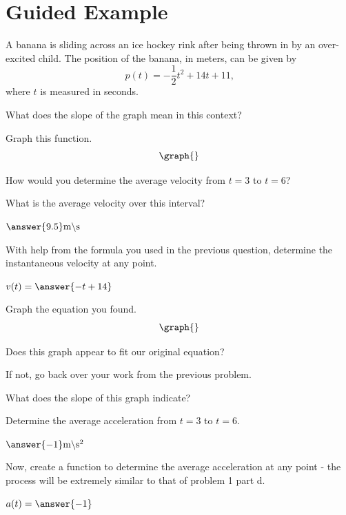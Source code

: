 \documentclass{ximera}
\begin{document}
\section{Guided Example}
\begin{question}
A banana is sliding across an ice hockey rink after being thrown in by an over-excited child. The position of the banana, in meters, can be given by $$p(t) = -\dfrac{1}{2}t^2+14t+11\text{,}$$ where $t$ is measured in seconds.

What does the slope of the graph mean in this context?
\begin{multipleChoice}
\end{multipleChoice}

Graph this function.
\[
    \graph{}
\]

How would you determine the average velocity from $t = 3$ to $t = 6$?

\begin{multipleChoice}
\end{multipleChoice}


What is the average velocity over this interval?

$\answer{9.5}\text{m} \backslash \text{s}$

With help from the formula you used in the previous question, determine the instantaneous velocity at any point.

$v(t) =  \answer{-t+14}$


Graph the equation you found.
\[
    \graph{}
\]

Does this graph appear to fit our original equation?

\begin{multipleChoice}
\end{multipleChoice}

If not, go back over your work from the previous problem.


What does the slope of this graph indicate?

\begin{multipleChoice}
\end{multipleChoice}

Determine the average acceleration from $t = 3$ to $t = 6$.

$\answer{-1} \text{m}\backslash\text{s}^2$

Now, create a function to determine the average acceleration at any point - the process will be extremely similar to that of problem 1 part d.

$a(t) = \answer{-1}$
\end{question}
\end{document}
